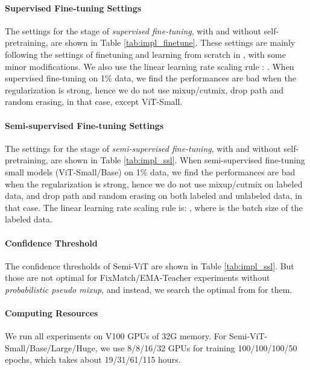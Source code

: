 \documentclass{article}
\begin{document}
\paragraph{Supervised Fine-tuning Settings}  
The settings for the stage of \emph{supervised fine-tuning}, with and without self-pretraining, are shown in Table \ref{tab:impl_finetune}. These settings are mainly following the settings of finetuning and learning from scratch in \cite{he2021masked}, with some minor modifications. We also use the linear learning rate scaling rule \cite{DBLP:journals/corr/GoyalDGNWKTJH17}: . When supervised fine-tuning on 1\% data, we find the performances are bad when the regularization is strong, hence we do not use mixup/cutmix, drop path and random erasing, in that case, except ViT-Small. 

\paragraph{Semi-supervised Fine-tuning Settings}
The settings for the stage of \emph{semi-supervised fine-tuning}, with and without self-pretraining, are shown in Table \ref{tab:impl_ssl}. When semi-supervised fine-tuning small models (ViT-Small/Base) on 1\% data, we find the performances are bad when the regularization is strong, hence we do not use mixup/cutmix on labeled data, and drop path and random erasing on both labeled and unlabeled data, in that case. The linear learning rate scaling rule is: , where  is the batch size of the labeled data.


\paragraph{Confidence Threshold} The confidence thresholds of Semi-ViT are shown in Table \ref{tab:impl_ssl}. But those are not optimal for FixMatch/EMA-Teacher experiments without \emph{probabilistic pseudo mixup}, and instead, we search the optimal  from  for them.


\paragraph{Computing Resources} We run all experiments on V100 GPUs of 32G memory. For Semi-ViT-Small/Base/Large/Huge, we use 8/8/16/32 GPUs for training 100/100/100/50 epochs, which takes about 19/31/61/115 hours.
\end{document}
